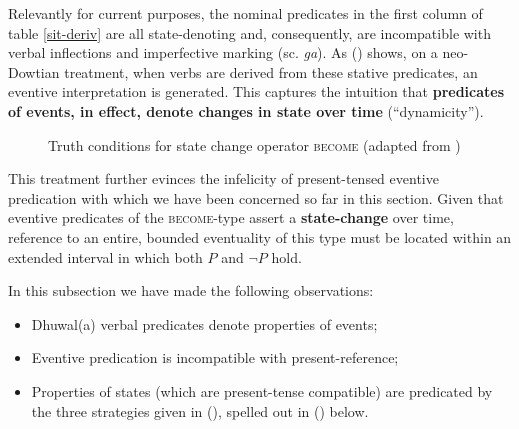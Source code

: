 \documentclass[11pt,dvipsnames]{report}
\begin{document}
Relevantly for current purposes, the nominal predicates in the first column of table \ref{sit-deriv} are all state-denoting and, consequently, are incompatible with verbal inflections and imperfective marking (sc. \textit{ga}). As () shows, on a neo-Dowtian treatment, when verbs are derived from these stative predicates, an eventive interpretation is generated. This captures the intuition that \textbf{predicates of events, in effect, denote changes in state over time} (``dynamicity''). 

\begin{figure}[h]
\caption{Truth conditions for state change operator \textsc{become} (adapted from \citealp{Dowty1979})}\label{become-dia}\centering
{}
\end{figure}

This treatment further evinces the infelicity of present-tensed eventive predication with which we have been concerned so far in this section. Given that eventive predicates of the \textsc{become}-type assert a \textbf{state-change} over time, reference to an entire, bounded eventuality of this type must be located within an extended interval in which both $ P $ and $ \neg P $ hold.

In this subsection we have made the following observations:
\begin{itemize}
	\item Dhuwal(a) verbal predicates denote properties of events;
	\item Eventive predication is incompatible with present-reference;
	\item Properties of states (which are present-tense compatible) are predicated by the three strategies given in (), spelled out in (\nextx) below. 
\end{itemize}
\end{document}
